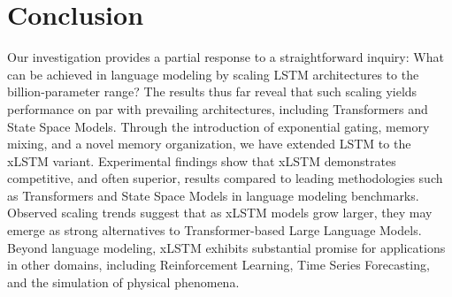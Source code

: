 \section{Conclusion}
Our investigation provides a partial response to a straightforward inquiry: What can be achieved in language modeling by scaling LSTM architectures to the billion-parameter range? The results thus far reveal that such scaling yields performance on par with prevailing architectures, including Transformers and State Space Models. Through the introduction of exponential gating, memory mixing, and a novel memory organization, we have extended LSTM to the xLSTM variant. Experimental findings show that xLSTM demonstrates competitive, and often superior, results compared to leading methodologies such as Transformers and State Space Models in language modeling benchmarks. Observed scaling trends suggest that as xLSTM models grow larger, they may emerge as strong alternatives to Transformer-based Large Language Models. Beyond language modeling, xLSTM exhibits substantial promise for applications in other domains, including Reinforcement Learning, Time Series Forecasting, and the simulation of physical phenomena.

